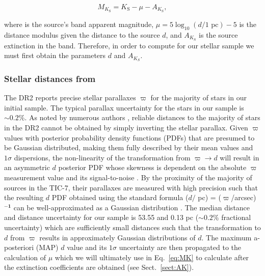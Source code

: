 \begin{equation}
  M_{K_{\text{S}}} = K_{\text{S}} - \mu - A_{K_{\text{S}}}, \label{eq:MK}
\end{equation}

\noindent where \Ks{} is the source's \Ks{-}band apparent magnitude, $\mu = 5\log_{10}{(d/\text{1 pc})} - 5$
is the distance modulus given the distance to the source $d$, and $A_{K_{\text{S}}}$ is the source extinction in the
\Ks{-}band. Therefore, in order to compute \MK{} for our stellar sample we must first obtain the parameters $d$ and
$A_{K_S}$.

\subsubsection{Stellar distances from \gaia{}}
The \gaia{} DR2 reports precise stellar parallaxes $\varpi$ for the majority of stars in our initial sample.
The typical parallax uncertainty for the stars in our sample is $\sim 0.2$\%.
As noted by numerous authors \citep[e.g.][]{bailorjones15,astraatmadja16,luri18}, reliable distances to the
majority of stars in the \gaia{} DR2 cannot be obtained by simply inverting the stellar parallax. Given $\varpi$
values with posterior probability density functions (PDFs) that are presumed to be Gaussian distributed, making them
fully described by their mean values and $1\sigma$ dispersions, the non-linearity
of the transformation from $\varpi \to d$ will result in an asymmetric $d$ posterior PDF whose skewness
is dependent on the absolute $\varpi$ measurement value and its signal-to-noise \citep{luri18}.
By the proximity of the majority of sources in the TIC-7, their parallaxes are measured with high precision such
that the resulting $d$ PDF obtained using the standard formula ($d/$ pc) = ($\varpi$/arcsec)$\mathbf{^{-1}}$
can be well-approximated as a Gaussian distribution \citep{bailorjones18}.
The median distance and distance uncertainty for our sample is 53.55 and 0.13 pc ($\sim 0.2$\% fractional uncertainty)
which are sufficiently small distances such that the transformation to $d$ from $\varpi$ results in approximately
Gaussian distributions of $d$.
The maximum a-posteriori (MAP) $d$ value and its $1\sigma$
uncertainty are then propagated to the calculation of $\mu$ which we will ultimately use in Eq.~\ref{eq:MK} to
calculate \MK{} after the extinction coefficients are obtained (see Sect.~\ref{sect:AK}). \\

